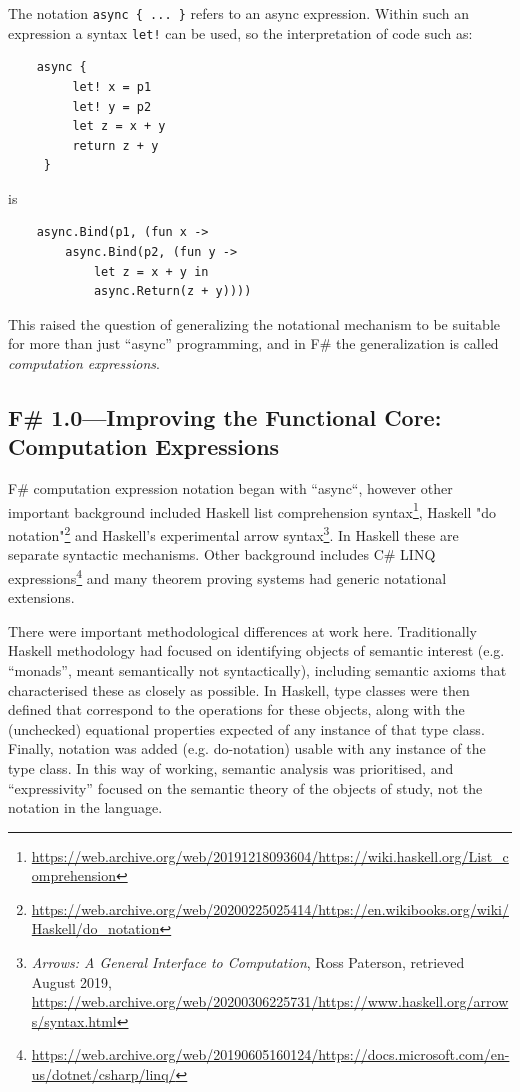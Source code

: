 \documentclass[acmsmall]{acmart}\settopmatter{}
\begin{document}
The notation \texttt{async \{ ... \}} refers to an async expression. Within such an expression a syntax \texttt{let!} can be used, so the interpretation of code such as:
\begin{verbatim}
    async { 
         let! x = p1 
         let! y = p2
         let z = x + y
         return z + y 
     }
\end{verbatim}
is
\begin{verbatim}
    async.Bind(p1, (fun x -> 
        async.Bind(p2, (fun y -> 
            let z = x + y in
            async.Return(z + y))))
\end{verbatim}
This raised the question of generalizing the notational mechanism to be suitable for more than just ``async'' programming, and in F\# the 
generalization is called \emph{computation expressions}.

\subsection*{F\# 1.0---Improving the Functional Core: Computation Expressions}

F\# computation expression notation began with ``async``, however other important background included Haskell list comprehension syntax\footnote{\url{https://web.archive.org/web/20191218093604/https://wiki.haskell.org/List_comprehension}}, Haskell "do notation"\footnote{\url{https://web.archive.org/web/20200225025414/https://en.wikibooks.org/wiki/Haskell/do_notation}} and Haskell's experimental
arrow syntax\footnote{\textit{Arrows: A General Interface to Computation}, Ross Paterson, retrieved August 2019, \url{https://web.archive.org/web/20200306225731/https://www.haskell.org/arrows/syntax.html}}.
In Haskell these are separate syntactic mechanisms.
Other background includes C\# LINQ expressions\footnote{\url{https://web.archive.org/web/20190605160124/https://docs.microsoft.com/en-us/dotnet/csharp/linq/}} and many
theorem proving systems had generic notational extensions.

There were important methodological differences at work here.  Traditionally Haskell methodology had focused on
identifying objects of semantic interest (e.g. ``monads'', meant semantically not syntactically), including
semantic axioms that characterised these as closely as possible. In Haskell, type classes were then defined that
correspond to the operations for these objects, along with the (unchecked) equational properties
expected of any instance of that type class. Finally, notation was added (e.g. do-notation) usable with
any instance of the type class.  In this way of working, semantic analysis was prioritised, and ``expressivity'' focused on the semantic theory of the objects of study,
not the notation in the language.
\end{document}
